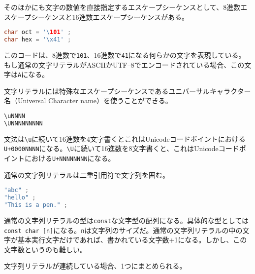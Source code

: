 そのほかにも文字の数値を直接指定するエスケープシーケンスとして、8進数エスケープシーケンスと16進数エスケープシーケンスがある。

\begin{lstlisting}[language={C++}]
char oct = '\101' ;
char hex = '\x41' ;
\end{lstlisting}

このコードは、8進数で\texttt{101}、16進数で\texttt{41}になる何らかの文字を表現している。もし通常の文字リテラルがASCIIかUTF--8でエンコードされている場合、この文字は\texttt{A}になる。


文字リテラルには特殊なエスケープシーケンスであるユニバーサルキャラクター名（Universal Character name）を使うことができる。

\begin{lstlisting}[language={C++}]
\uNNNN
\UNNNNNNNNN
\end{lstlisting}

文法は\texttt{{\textbackslash}u}に続いて16進数を4文字書くとこれはUnicodeコードポイントにおける\texttt{U+0000NNNN}になる。\texttt{{\textbackslash}U}に続いて16進数を8文字書くと、これはUnicodeコードポイントにおける\texttt{U+NNNNNNNN}になる。


通常の文字列リテラルは二重引用符で文字列を囲む。

\begin{lstlisting}[language={C++}]
"abc" ;
"hello" ;
"This is a pen." ;
\end{lstlisting}

通常の文字列リテラルの型は\texttt{const}な文字型の配列になる。具体的な型としては\texttt{const char [n]}になる。\texttt{n}は文字列のサイズだ。通常の文字列リテラルの中の文字が基本実行文字だけであれば、書かれている文字数+1になる。しかし、この文字数というのも難しい。

文字列リテラルが連続している場合、1つにまとめられる。

